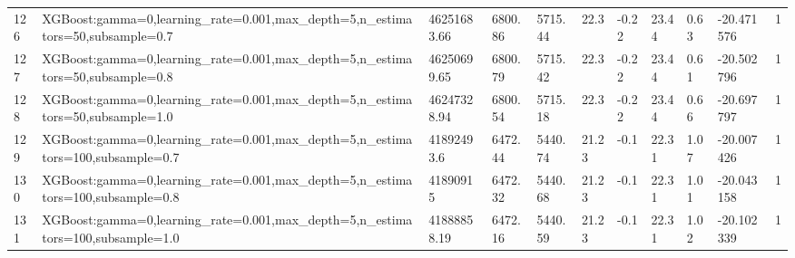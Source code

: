 \begin{longtable}{C{0.8cm} L{2cm} C{1.15cm} C{1.15cm} C{1.15cm} C{1.15cm} C{0.85cm} C{1.25cm} C{1.2cm} C{1.5cm} C{1.0cm}}
126 & XGBoost:\newline gamma=0,\newline learning\_rate=0.001,\newline max\_depth=5,\newline n\_estimators=50,\newline subsample=0.7 & 46251683.66 & 6800.86 & 5715.44 & 22.3 & -0.22 & 23.44 & 0.63 & -20.471576 & 1 \\
127 & XGBoost:\newline gamma=0,\newline learning\_rate=0.001,\newline max\_depth=5,\newline n\_estimators=50,\newline subsample=0.8 & 46250699.65 & 6800.79 & 5715.42 & 22.3 & -0.22 & 23.44 & 0.61 & -20.502796 & 1 \\
128 & XGBoost:\newline gamma=0,\newline learning\_rate=0.001,\newline max\_depth=5,\newline n\_estimators=50,\newline subsample=1.0 & 46247328.94 & 6800.54 & 5715.18 & 22.3 & -0.22 & 23.44 & 0.66 & -20.697797 & 1 \\
129 & XGBoost:\newline gamma=0,\newline learning\_rate=0.001,\newline max\_depth=5,\newline n\_estimators=100,\newline subsample=0.7 & 41892493.6 & 6472.44 & 5440.74 & 21.23 & -0.1 & 22.31 & 1.07 & -20.007426 & 1 \\
130 & XGBoost:\newline gamma=0,\newline learning\_rate=0.001,\newline max\_depth=5,\newline n\_estimators=100,\newline subsample=0.8 & 41890915 & 6472.32 & 5440.68 & 21.23 & -0.1 & 22.31 & 1.01 & -20.043158 & 1 \\
131 & XGBoost:\newline gamma=0,\newline learning\_rate=0.001,\newline max\_depth=5,\newline n\_estimators=100,\newline subsample=1.0 & 41888858.19 & 6472.16 & 5440.59 & 21.23 & -0.1 & 22.31 & 1.02 & -20.102339 & 1 \\

\end{longtable}
